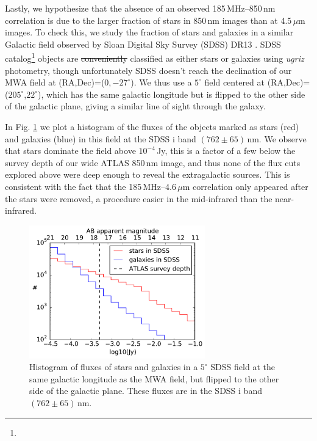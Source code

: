 \documentclass[numberedappendix]{emulateapj}
\providecommand{\DIFdel}[1]{{\protect\color{red}\sout{#1}}}                      %
\providecommand{\DIFdelbegin}{} %
\providecommand{\DIFdelend}{} %
\providecommand{\DIFaddbeginFL}{} %
\providecommand{\DIFaddendFL}{} %
\providecommand{\DIFdelbeginFL}{} %
\providecommand{\DIFdelendFL}{} %
\begin{document}
Lastly, we hypothesize that the absence of an observed 185\,MHz--850\,nm correlation is due to the larger fraction of stars in 850\,nm images than at 4.5\,$\mu$m images. To check this, we study the fraction of stars and galaxies in a similar Galactic field observed by Sloan Digital Sky Survey (SDSS) \citep{sdssiii} DR13 \citep{sdssdr13}. SDSS catalog\footnote{} objects are \DIFdelbegin \DIFdel{conveniently }\DIFdelend classified as either stars or galaxies using \textit{ugriz} photometry, though unfortunately SDSS doesn't reach the declination of our MWA field at (RA,Dec)=($0,-27^\circ$). We thus use a $5^\circ$ field centered at (RA,Dec)=($205^\circ$,$22^\circ$), which has the same galactic longitude but is flipped to the other side of the galactic plane, giving a similar line of sight through the galaxy.

In Fig. \ref{fig:sdssstarsgals} we plot a histogram of the fluxes of the objects marked as stars (red) and galaxies (blue) in this field at the SDSS i band $(762\pm65)$\,nm. We observe that stars dominate the field above  $10^{-4}$\,Jy, this is a factor of a few below the survey depth of our wide ATLAS 850\,nm image, and thus none of the flux cuts explored above were deep enough to reveal the extragalactic sources. This is consistent with the fact that the 185\,MHz--4.6\,$\mu$m correlation only appeared after the stars were removed, a procedure easier in the mid-infrared than the near-infrared. 

\begin{figure}[h]
\centering
\DIFdelbeginFL %
\DIFdelendFL \DIFaddbeginFL \includegraphics[width=3in]{chap5_xcor/sdss_stars_galaxies_hist_l=15_b=78_500000sources.pdf}
\DIFaddendFL \caption[Histogram of SDSS fluxes of stars and galaxies in a similar field to our ATLAS field.]{Histogram of fluxes of stars and galaxies in a $5^\circ$ SDSS field at the same galactic longitude as the MWA field, but flipped to the other side of the galactic plane. These fluxes are in the SDSS i band $(762\pm65)$\,nm. }
\label{fig:sdssstarsgals}
\end{figure}
\end{document}
